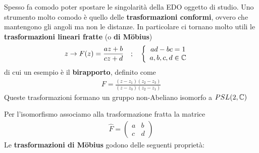Spesso fa comodo poter spostare le singolarità della EDO oggetto di studio. Uno strumento molto comodo è quello delle \textbf{trasformazioni conformi}, ovvero che mantengono gli angoli ma non le distanze. In particolare ci tornano molto utili le \textbf{trasformazioni lineari fratte} (o \textbf{di Möbius})
\begin{align}
	&z \to F(z) = \frac{az +b}{cz+d} \quad ; \quad \left\{ \begin{array}{cc} ad-bc= 1\\ a,b,c,d\in \mathbb{C} \end{array} \right. 
\end{align}
di cui un esempio è il \textbf{birapporto}, definito come
\begin{align}
	F = \frac{(z -z_1)(z_2 -z_3)}{(z -z_3)(z_2 -z_1)}
\end{align}
Queste trasformazioni formano un gruppo non-Abeliano isomorfo a $PSL(2,\mathbb{C})$

Per l'isomorfismo associamo alla trasformazione fratta la matrice
\begin{align}
	\hat{F} = \begin{pmatrix}
		a & b \\
		c & d
	\end{pmatrix}
\end{align}
Le \textbf{trasformazioni di Möbius} godono delle seguenti proprietà:

